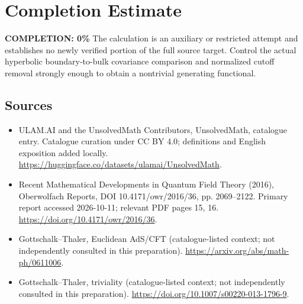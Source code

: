 \documentclass[11pt]{article}
\begin{document}
\section{Completion Estimate}
\noindent\textbf{COMPLETION: 0\%}
The calculation is an auxiliary or restricted attempt and establishes no newly verified portion of the full source target. Control the actual hyperbolic boundary-to-bulk covariance comparison and normalized cutoff removal strongly enough to obtain a nontrivial generating functional.

\subsection{Sources}
\begin{itemize}
\item[\hypertarget{source:statement:1}{S1}] ULAM.AI and the UnsolvedMath Contributors, UnsolvedMath, catalogue entry. Catalogue curation under CC BY 4.0; definitions and English exposition added locally.
\url{https://huggingface.co/datasets/ulamai/UnsolvedMath}.
\item[\hypertarget{source:statement:2}{S2}] Recent Mathematical Developments in Quantum Field Theory (2016), Oberwolfach Reports, DOI 10.4171/owr/2016/36, pp. 2069--2122. Primary report accessed 2026-10-11; relevant PDF pages 15, 16.
\url{https://doi.org/10.4171/owr/2016/36}.
\item[\hypertarget{source:statement:3}{S3}] Gottschalk--Thaler, Euclidean AdS/CFT (catalogue-listed context; not independently consulted in this preparation).
\url{https://arxiv.org/abs/math-ph/0611006}.
\item[\hypertarget{source:statement:4}{S4}] Gottschalk--Thaler, triviality (catalogue-listed context; not independently consulted in this preparation).
\url{https://doi.org/10.1007/s00220-013-1796-9}.
\end{itemize}
\label{end:statement}
\end{document}
